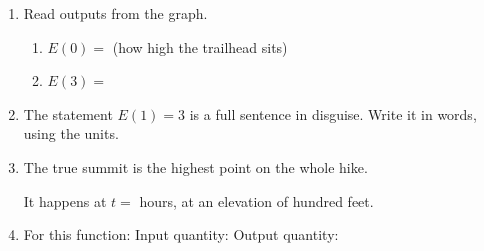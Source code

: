 \documentclass[10pt]{article}
\begin{document}
\boxguard
\begin{tcolorbox}[colback=white, colframe=black!40,
    title=\textbf{Tier R --- Remediate},
    fonttitle=\bfseries, arc=2mm, left=3mm, right=3mm, top=2mm, bottom=2mm]

\begin{enumerate}[itemsep=8pt]
  \item Read outputs from the graph.

        \begin{enumerate}[label=(\alph*), itemsep=4pt]
          \item $E(0) = $ \blank{1.6cm} \quad (how high the trailhead sits)
          \item $E(3) = $ \blank{1.6cm}
        \end{enumerate}

  \item The statement $E(1) = 3$ is a full sentence in disguise. Write it in
        words, using the units.

        \vspace{0.05in}
        \writeline

  \item The true summit is the highest point on the whole hike.

        \vspace{0.05in}
        It happens at $t = $ \blank{1.6cm} hours, at an elevation of
        \blank{1.6cm} hundred feet.

  \item For this function: \quad Input quantity: \blank{2.8cm} \quad
        Output quantity: \blank{3.2cm}
\end{enumerate}
\end{tcolorbox}

\vspace{0.1in}
\end{document}
